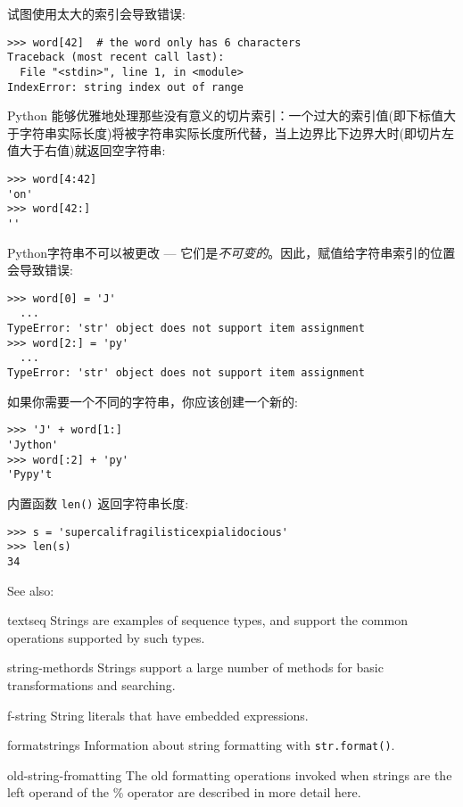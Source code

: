 试图使用太大的索引会导致错误:
\begin{lstlisting}
>>> word[42]  # the word only has 6 characters
Traceback (most recent call last):
  File "<stdin>", line 1, in <module>
IndexError: string index out of range
\end{lstlisting}
Python 能够优雅地处理那些没有意义的切片索引：一个过大的索引值(即下标值大于字符串实际长度)将被字符串实际长度所代替，当上边界比下边界大时(即切片左值大于右值)就返回空字符串:
\begin{lstlisting}
>>> word[4:42]
'on'
>>> word[42:]
''
\end{lstlisting}
Python字符串不可以被更改 — 它们是\emph{不可变的}。因此，赋值给字符串索引的位置会导致错误:
\begin{lstlisting}
>>> word[0] = 'J'
  ...
TypeError: 'str' object does not support item assignment
>>> word[2:] = 'py'
  ...
TypeError: 'str' object does not support item assignment
\end{lstlisting}
如果你需要一个不同的字符串，你应该创建一个新的:
\begin{lstlisting}
>>> 'J' + word[1:]
'Jython'
>>> word[:2] + 'py'
'Pypy't
\end{lstlisting}
内置函数 \texttt{len()} 返回字符串长度:
\begin{lstlisting}
>>> s = 'supercalifragilisticexpialidocious'
>>> len(s)
34
\end{lstlisting}
See also:
\begin{compactdesc}
  \item[textseq] Strings are examples of sequence types, and support the common operations supported by such types.
  \item[string-methords] Strings support a large number of methods for basic transformations and searching.
  \item[f-string] String literals that have embedded expressions.
  \item[formatstrings] Information about string formatting with \texttt{str.format()}.
  \item[old-string-fromatting] The old formatting operations invoked when strings are the left operand of the \% operator are
described in more detail here.
\end{compactdesc}
